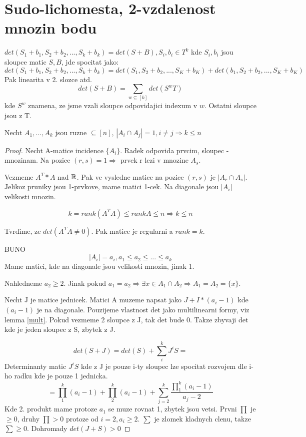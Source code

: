 \section{\texorpdfstring{Sudo-lichomesta, 2-vzdalenost mnozin bodu}{Sudo-lichomesta, 2-vzdalenost mnozin bodu}}
\vspace{5mm}
\large


\begin{lemma}\label{mult}
	$det(S_1 + b_1, S_2 + b_2 , ... , S_k + b_k) = det(S + B), S_i, b_i \in T^k$ kde $S_i,b_i$ jsou sloupce matic $S, B$, jde spocitat jako:
	\[ det(S_1 + b_1, S_2 + b_2 , ... , S_k + b_k) = det(S_1, S_2 + b_2 , ... , S_K + b_K) + det(b_1, S_2 + b_2 , ... , S_K + b_K) \]
	Pak linearita v 2. slozce atd.
	\[ det(S + B) = \sum_{w \subseteq [k]} det(S^wT) \]
	kde $S^w$ znamena, ze jsme vzali sloupce odpovidajici indexum v $w$. Ostatni sloupce jsou z T.
\end{lemma}


\begin{theorem}
	Necht $A_1, ... , A_k$ jsou ruzne $ \subseteq [n]$, $ |A_i \cap A_j| = 1, i \ne j \Rightarrow k \leq n$
\end{theorem}
\begin{proof}
	Necht A-matice incidence $\{A_i\}$. Radek odpovida prvcim, sloupec - mnozinam. Na pozice $(r,s) = 1 \Rightarrow$ prvek r lezi v mnozine $A_s$.

	Vezmeme $A^T * A$ nad $\operatorname{\mathbb{R}}$. Pak ve vysledne matice na pozice $(r,s)$ je $|A_r \cap A_s|$. Jelikoz pruniky jsou 1-prvkove, mame matici 1-cek. Na diagonale jsou $|A_i|$ velikosti mnozin.

	\[ k = rank(A^TA) \leq rank A \leq n \Rightarrow k \leq n \]

	Tvrdime, ze $det(A^TA \ne 0)$. Pak matice je regularni a $rank = k$.

	BUNO
	\[|A_i| = a_i, a_1 \leq a_2 \leq ... \leq a_k\]
	Mame matici, kde na diagonale jsou velikosti mnozin, jinak 1.

	Nahledneme $a_2 \geq 2$. Jinak pokud $a_1 = a_2 \Rightarrow \exists x \in A_1 \cap A_2 \Rightarrow A_1 = A_2 = \{ x \} $.

	Necht J je matice jednicek. Matici A muzeme napsat jako $J + I*(a_i - 1)$ kde $(a_i - 1)$ je na diagonale.
	Pouzijeme vlastnost det jako multilinearni formy, viz lemma \cref{mult}. Pokud vezmeme 2 sloupce z J, tak det bude 0. Takze zbyvaji det kde je jeden sloupec z S, zbytek z J.

	\[ det(S + J) = det(S) + \sum_i^k J^iS = \]
	Determinanty matic $J^iS$ kde z J je pouze i-ty sloupec lze spocitat rozvojem dle i-ho radku kde je pouze 1 jednicka.
	\[ = \prod_1^k (a_i - 1) + \prod_2^k (a_i - 1) + \sum_{j=2}^k \frac{\prod_1^k (a_i - 1)}{a_j - 2} \]
	Kde 2. produkt mame protoze $a_1$ se muze rovnat 1, zbytek jsou vetsi. Prvni $\prod$ je $\geq 0$, druhy $\prod > 0$ protoze od $i = 2, a_i \geq 2$. $\sum$ je zlomek kladnych clenu, takze $\sum \geq 0$. Dohromady $ det(J + S) > 0$

\end{proof}

